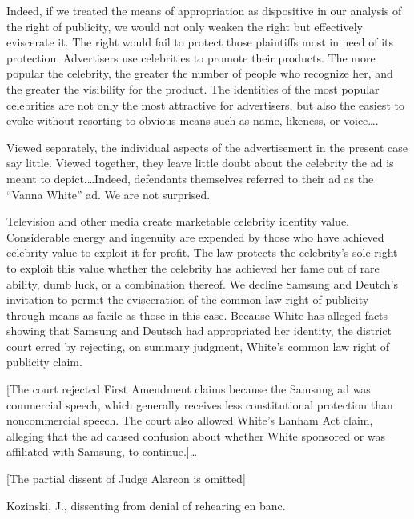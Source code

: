Indeed, if we treated the means of appropriation as dispositive in our analysis
of the right of publicity, we would not only weaken the right but effectively
eviscerate it. The right would fail to protect those plaintiffs most in need of
its protection. Advertisers use celebrities to promote their products. The more
popular the celebrity, the greater the number of people who recognize her, and
the greater the visibility for the product. The identities of the most popular
celebrities are not only the most attractive for advertisers, but also the
easiest to evoke without resorting to obvious means such as name, likeness, or
voice\dots.

Viewed separately, the individual aspects of the advertisement in the present
case say little. Viewed together, they leave little doubt about the celebrity
the ad is meant to depict.\dots Indeed, defendants themselves referred to
their ad as the ``Vanna White'' ad. We are not surprised.

Television and other media create marketable celebrity identity value.
Considerable energy and ingenuity are expended by those who have achieved
celebrity value to exploit it for profit. The law protects the celebrity's sole
right to exploit this value whether the celebrity has achieved her fame out of
rare ability, dumb luck, or a combination thereof. We decline Samsung and
Deutch's invitation to permit the evisceration of the common law right of
publicity through means as facile as those in this case. Because White has
alleged facts showing that Samsung and Deutsch had appropriated her identity,
the district court erred by rejecting, on summary judgment, White's common law
right of publicity claim.

[The court rejected First Amendment claims because the Samsung ad was commercial
speech, which generally receives less constitutional protection than
noncommercial speech.  The court also allowed White's Lanham Act claim,
alleging that the ad caused confusion about whether White sponsored or was
affiliated with Samsung, to continue.]\dots

[The partial dissent of Judge Alarcon is omitted]


\opinion Kozinski, J., dissenting from denial of rehearing en banc.

